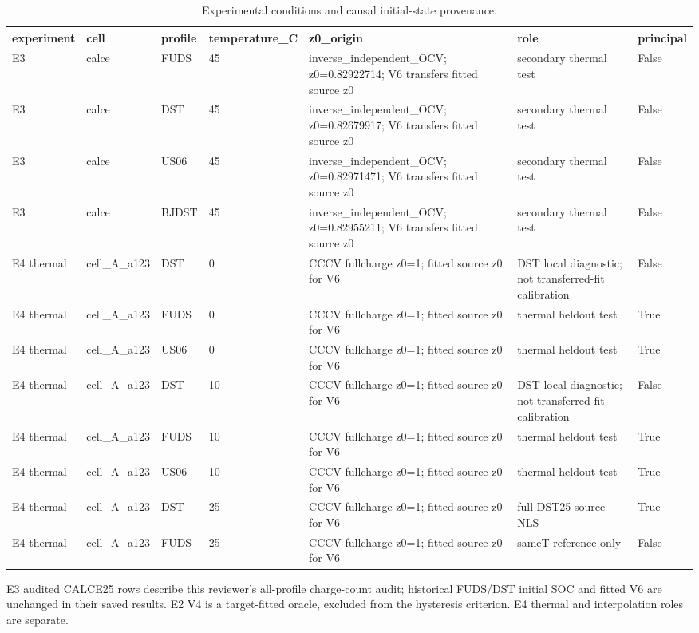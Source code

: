 \begin{table}[!t]
\centering
\footnotesize
\caption{Experimental conditions and causal initial-state provenance.}
\label{tab:reviewer-conditions-5}
\setlength{\tabcolsep}{3pt}
\begin{tabular}{llll p{} p{} l}
\toprule
experiment & cell & profile & temperature\_C & z0\_origin & role & principal \\
\midrule
E3 & calce & FUDS & 45 & inverse\_independent\_OCV; z0=0.82922714; V6 transfers fitted source z0 & secondary thermal test & False \\
E3 & calce & DST & 45 & inverse\_independent\_OCV; z0=0.82679917; V6 transfers fitted source z0 & secondary thermal test & False \\
E3 & calce & US06 & 45 & inverse\_independent\_OCV; z0=0.82971471; V6 transfers fitted source z0 & secondary thermal test & False \\
E3 & calce & BJDST & 45 & inverse\_independent\_OCV; z0=0.82955211; V6 transfers fitted source z0 & secondary thermal test & False \\
E4 thermal & cell\_A\_a123 & DST & 0 & CCCV fullcharge z0=1; fitted source z0 for V6 & DST local diagnostic; not transferred-fit calibration & False \\
E4 thermal & cell\_A\_a123 & FUDS & 0 & CCCV fullcharge z0=1; fitted source z0 for V6 & thermal heldout test & True \\
E4 thermal & cell\_A\_a123 & US06 & 0 & CCCV fullcharge z0=1; fitted source z0 for V6 & thermal heldout test & True \\
E4 thermal & cell\_A\_a123 & DST & 10 & CCCV fullcharge z0=1; fitted source z0 for V6 & DST local diagnostic; not transferred-fit calibration & False \\
E4 thermal & cell\_A\_a123 & FUDS & 10 & CCCV fullcharge z0=1; fitted source z0 for V6 & thermal heldout test & True \\
E4 thermal & cell\_A\_a123 & US06 & 10 & CCCV fullcharge z0=1; fitted source z0 for V6 & thermal heldout test & True \\
E4 thermal & cell\_A\_a123 & DST & 25 & CCCV fullcharge z0=1; fitted source z0 for V6 & full DST25 source NLS & True \\
E4 thermal & cell\_A\_a123 & FUDS & 25 & CCCV fullcharge z0=1; fitted source z0 for V6 & sameT reference only & False \\
\bottomrule
\end{tabular}
\par\smallskip\begin{minipage}{0.98\textwidth}\footnotesize E3 audited CALCE25 rows describe this reviewer's all-profile charge-count audit; historical FUDS/DST initial SOC and fitted V6 are unchanged in their saved results. E2 V4 is a target-fitted oracle, excluded from the hysteresis criterion. E4 thermal and interpolation roles are separate.\end{minipage}
\end{table}

